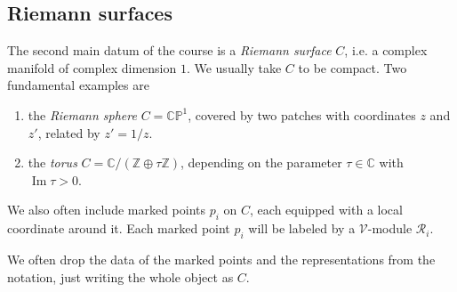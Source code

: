 \documentclass[12pt,letterpaper,reqno]{amsart}
\makeatletter
\numberwithin{equation}{section}
\newcommand{\bbC}{\ensuremath{\mathbb C}}
\newcommand{\bbP}{\ensuremath{\mathbb P}}
\newcommand{\bbZ}{\ensuremath{\mathbb Z}}
\DeclareRobustCommand{\nop}[1]{\mathpalette\nop@{#1}}
\newcommand{\nop@}[2]{%
  \mathinner{%
    \mkern0.4mu:\mkern0.4mu #2 \mkern0.4mu:\mkern0.4mu%
  }%
}
\newcommand\vac{{|\Omega\rangle}}
\newcommand{\vertex}{\mathcal{V}}
\newcommand{\vrep}{\mathcal{R}}
\newcommand{\Conf}{\textrm{Conf}}
\newcommand{\ti}[1]{\textit{#1}}
\DeclareMathOperator{\im}{Im}
\makeatother
\begin{document}



\subsection{Riemann surfaces}

The second main datum of the course is a \ti{Riemann surface} $C$, 
i.e. a complex manifold of complex dimension $1$. 
We usually take $C$ to be compact. 
Two fundamental examples are 
\begin{enumerate}
\item the \ti{Riemann sphere} $C = \bbC \bbP^1$, covered by two patches with coordinates $z$ and $z'$, related by $z' = 1/z$.
\item the \ti{torus} $C = \bbC / (\bbZ \oplus \tau \bbZ)$, depending
on the parameter $\tau \in \bbC$ with $\im \tau > 0$.
\end{enumerate}

We also often include marked points $p_i$ on $C$, each 
equipped with a local coordinate around it. 
Each marked point $p_i$ will be labeled by a $\vertex$-module 
$\vrep_i$.

We often drop the data of the marked points and the representations from the notation, just writing the whole object as $C$.



\end{document}
